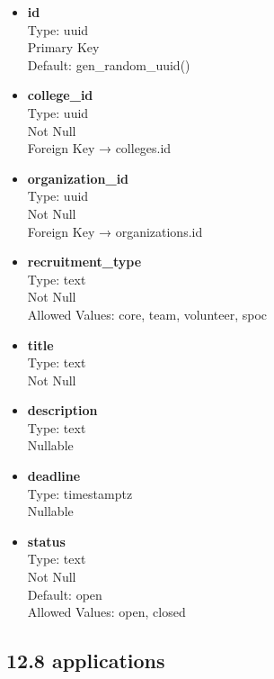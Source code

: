 \documentclass[12pt]{article}
\begin{document}
\begin{itemize}
    \item \textbf{id} \\
    Type: uuid \\
    Primary Key \\
    Default: gen\_random\_uuid()

    \item \textbf{college\_id} \\
    Type: uuid \\
    Not Null \\
    Foreign Key → colleges.id

    \item \textbf{organization\_id} \\
    Type: uuid \\
    Not Null \\
    Foreign Key → organizations.id

    \item \textbf{recruitment\_type} \\
    Type: text \\
    Not Null \\
    Allowed Values: core, team, volunteer, spoc

    \item \textbf{title} \\
    Type: text \\
    Not Null

    \item \textbf{description} \\
    Type: text \\
    Nullable

    \item \textbf{deadline} \\
    Type: timestamptz \\
    Nullable

    \item \textbf{status} \\
    Type: text \\
    Not Null \\
    Default: open \\
    Allowed Values: open, closed
\end{itemize}

\subsection*{12.8 applications}
\end{document}

